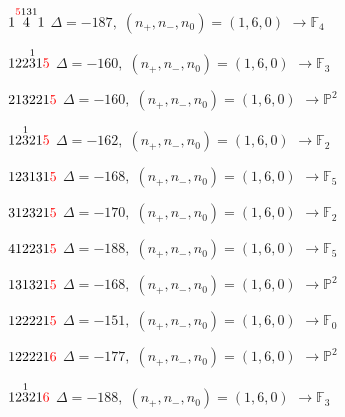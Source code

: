 \documentclass[10pt]{article}
\begin{document}
\smallskip

$1\overset{\textcolor{red}{5}131}{4}1$ \quad $\Delta=-187,\; (n_+,n_-,n_0)=(1,6,0)$ \quad $\to \mathbb{F}_{4}$

\smallskip

$122\overset{1}{3}1\textcolor{red}{5}$ \quad $\Delta=-160,\; (n_+,n_-,n_0)=(1,6,0)$ \quad $\to \mathbb{F}_{3}$

\smallskip

$213221\textcolor{red}{5}$ \quad $\Delta=-160,\; (n_+,n_-,n_0)=(1,6,0)$ \quad $\to \mathbb{P}^2$

\smallskip

$12\overset{1}{3}21\textcolor{red}{5}$ \quad $\Delta=-162,\; (n_+,n_-,n_0)=(1,6,0)$ \quad $\to \mathbb{F}_{2}$

\smallskip

$123131\textcolor{red}{5}$ \quad $\Delta=-168,\; (n_+,n_-,n_0)=(1,6,0)$ \quad $\to \mathbb{F}_{5}$

\smallskip

$312321\textcolor{red}{5}$ \quad $\Delta=-170,\; (n_+,n_-,n_0)=(1,6,0)$ \quad $\to \mathbb{F}_{2}$

\smallskip

$412231\textcolor{red}{5}$ \quad $\Delta=-188,\; (n_+,n_-,n_0)=(1,6,0)$ \quad $\to \mathbb{F}_{5}$

\smallskip

$131321\textcolor{red}{5}$ \quad $\Delta=-168,\; (n_+,n_-,n_0)=(1,6,0)$ \quad $\to \mathbb{P}^2$

\smallskip

$122221\textcolor{red}{5}$ \quad $\Delta=-151,\; (n_+,n_-,n_0)=(1,6,0)$ \quad $\to \mathbb{F}_{0}$

$122221\textcolor{red}{6}$ \quad $\Delta=-177,\; (n_+,n_-,n_0)=(1,6,0)$ \quad $\to \mathbb{P}^2$

\smallskip

$12\overset{1}{3}21\textcolor{red}{6}$ \quad $\Delta=-188,\; (n_+,n_-,n_0)=(1,6,0)$ \quad $\to \mathbb{F}_{3}$

\smallskip
\end{document}
